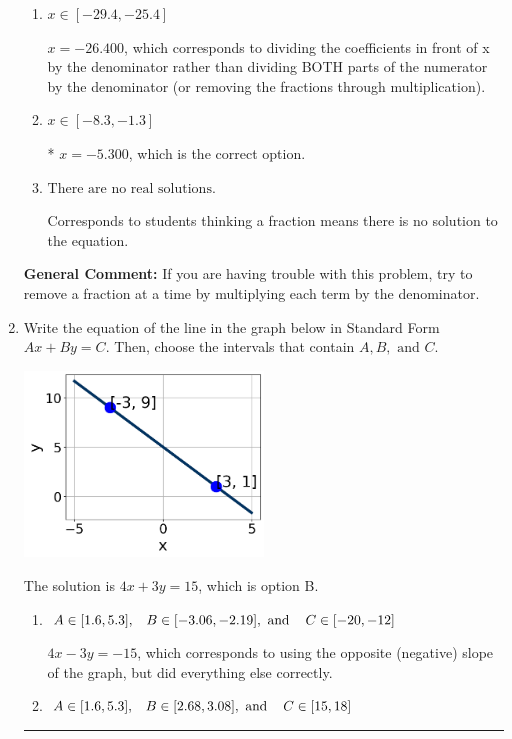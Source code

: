 \documentclass{extbook}[14pt]
\newcommand{\litem}[1]{\item #1

\rule{\textwidth}{0.4pt}}
\begin{document}
\begin{enumerate}
{\begin{enumerate}[label=\Alph*.]
 $x = -0.315$, which corresponds to dividing the second number in the numerator by the denominator rather than dividing BOTH parts of the numerator by the denominator (or removing the fractions through multiplication).
\item \( x \in [-29.4, -25.4] \)

 $x = -26.400$, which corresponds to dividing the coefficients in front of x by the denominator rather than dividing BOTH parts of the numerator by the denominator (or removing the fractions through multiplication).
\item \( x \in [-8.3, -1.3] \)

* $x = -5.300$, which is the correct option.
\item \( \text{There are no real solutions.} \)

Corresponds to students thinking a fraction means there is no solution to the equation.
\end{enumerate}

\textbf{General Comment:} If you are having trouble with this problem, try to remove a fraction at a time by multiplying each term by the denominator.
}
\litem{
Write the equation of the line in the graph below in Standard Form $Ax+By=C$. Then, choose the intervals that contain $A, B, \text{ and } C$.

\begin{center}
    \includegraphics[width=0.5\textwidth]{../Figures/linearGraphToStandardB.png}
\end{center}


The solution is \( 4x + 3y = 15 \), which is option B.\begin{enumerate}[label=\Alph*.]
\item \( A \in [1.6, 5.3], \hspace{3mm} B \in [-3.06, -2.19], \text{ and } \hspace{3mm} C \in [-20, -12] \)

 $4x - 3y = -15$, which corresponds to using the opposite (negative) slope of the graph, but did everything else correctly.
\item \( A \in [1.6, 5.3], \hspace{3mm} B \in [2.68, 3.08], \text{ and } \hspace{3mm} C \in [15, 18] \)


\end{enumerate}}
\end{enumerate}
\end{document}
